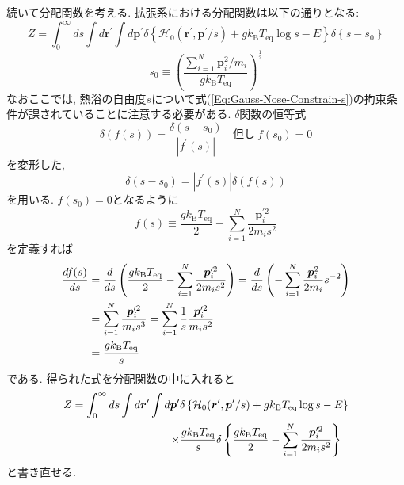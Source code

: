 続いて分配関数を考える. 拡張系における分配関数は以下の通りとなる:
\begin{equation}
    Z
    =
    \int_{0}^{\infty}ds
    \int d\bm{r}^{\prime}
    \int d\bm{p}^{\prime}
    \delta
    \left\{
        \mathcal{H}_{0}(\bm{r}^{\prime}, \bm{p}^{\prime}/s)
        +
        g k_{\mathrm{B}} T_{\mathrm{eq}} \log s
        -
        E
    \right\}
    \delta
    \left\{s - s_{0}\right\}
\end{equation}
\begin{equation}
    s_{0} \equiv
    \left(
        \frac
        {\sum_{i=1}^{N} \bm{p}_{i}^{2} / m_{i}}
        {g k_{\mathrm{B}} T_{\mathrm{eq}}}
    \right)^{\frac{1}{2}}
\end{equation}
なおここでは, 熱浴の自由度$s$について式(\ref{Eq:Gauss-Nose-Constrain-s})の拘束条件が課されていることに注意する必要がある.
$\delta$関数の恒等式
\begin{equation}
    \delta(f(s))
    =
    \frac{\delta (s - s_{0})}{|f^{\prime}(s)|}
    ~~~~
    \mathrm{但し}~ f(s_{0}) = 0
\end{equation}
を変形した,
\begin{equation}
    \delta(s - s_{0})
    =
    |f^{\prime}(s)| \delta(f(s))
\end{equation}
を用いる. $f(s_{0}) = 0$となるように
\begin{equation}
    f(s)
    \equiv
    \frac{g k_{\mathrm{B}} T_{\mathrm{eq}}}{2}
    -
    \sum_{i=1}^{N}
    \frac{\bm{p}_{i}^{\prime 2}}{2 m_{i} s^{2}}
\end{equation}
を定義すれば
\begin{align}
    \frac{d f(s)}{ds}
    &=
    \frac{d}{ds}
    \left(
        \frac{g k_{\mathrm{B}} T_{\mathrm{eq}}}{2}
        -
        \sum_{i=1}^{N}
        \frac{\bm{p}_{i}^{\prime 2}}{2 m_{i} s^{2}}
    \right)
    =
    \frac{d}{ds}
    \left(
        - \sum_{i=1}^{N}
        \frac{\bm{p}_{i}^{2}}{2m_{i}} s^{-2}
    \right)
    \notag \\
    &=
    \sum_{i=1}^{N}
    \frac{\bm{p}_{i}^{\prime 2}}{m_{i}s^{3}}
    =
    \sum_{i=1}^{N}
    \frac{1}{s}
    \frac{\bm{p}_{i}^{\prime 2}}{m_{i}s^{2}}
    \notag \\
    &=
    \frac{g k_{\mathrm{B}} T_{\mathrm{eq}}}{s}
\end{align}
である. 得られた式を分配関数の中に入れると
\begin{align}
    Z
    =
    \int_{0}^{\infty}ds
    \int d\bm{r}^{\prime}
    \int d\bm{p}^{\prime}
    &
    \delta
    \left\{
        \mathcal{H}_{0}(\bm{r}^{\prime}, \bm{p}^{\prime}/s)
        +
        g k_{\mathrm{B}} T_{\mathrm{eq}} \log s
        -
        E
    \right\}
    \notag \\
    \times
    &
    \frac{g k_{\mathrm{B}} T_{\mathrm{eq}}}{s}
    \delta
    \left\{
        \frac{g k_{\mathrm{B}} T_{\mathrm{eq}}}{2}
        -
        \sum_{i=1}^{N}
        \frac{\bm{p}_{i}^{\prime 2}}{2 m_{i} s^{2}}
    \right\}
\end{align}
と書き直せる.

